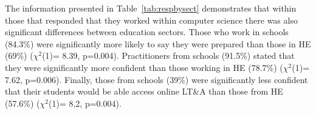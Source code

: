 \documentclass[conference]{IEEEtran}
\begin{document}


The information presented in Table~\ref{tab:respbysect} demonstrates
that within those that responded that they worked within computer
science there was also significant differences between education
sectors. Those who work in schools (84.3\%) were significantly more
likely to say they were prepared than those in HE (69\%) ($\chi^2$(1)=
8.39, p=0.004). Practitioners from schools (91.5\%) stated that they
were significantly more confident than those working in HE (78.7\%)
($\chi^2$(1)= 7.62, p=0.006). Finally, those from schools (39\%) were
significantly less confident that their students would be able access
online LT\&A than those from HE (57.6\%) ($\chi^2$(1)= 8,2,
p=0.004).

\end{document}
